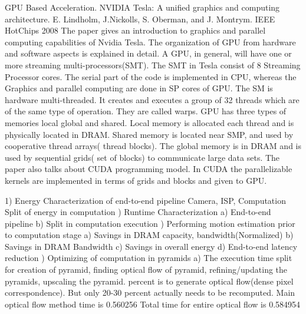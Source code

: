 GPU Based Acceleration.
NVIDIA Tesla: A unified graphics and computing architecture. E. Lindholm, J.Nickolls, S. Oberman, and J. Montrym. IEEE HotChips 2008
The paper gives an introduction to graphics and parallel computing capabilities of Nvidia Tesla. The organization of GPU from hardware and software aspects is explained in detail. A GPU, in general, will have one or more streaming multi-processors(SMT). The SMT in Tesla consist of 8 Streaming Processor cores. The serial part of the code is implemented in CPU, whereas the Graphics and parallel computing are done in SP cores of GPU. The SM is hardware multi-threaded. It creates and executes a group of 32 threads which are of the same type of operation. They are called warps. GPU has three types of memories local global and shared. Local memory is allocated each thread and is physically located in DRAM. Shared memory is located near SMP, and used by cooperative thread arrays( thread blocks). The global memory is in DRAM and is used by sequential grids( set of blocks) to communicate large data sets. The paper also talks about CUDA programming model. In CUDA the parallelizable kernels are implemented in terms of grids and blocks and given to GPU.

1) Energy Characterization of end-to-end pipeline\newline
Camera, ISP, Computation \newline
Split of energy in computation \newline
{}) Runtime Characterization \newline
a) End-to-end pipeline\newline
b) Split in computation execution\newline
{}) Performing motion estimation prior to computation stage\newline
a) Savings in DRAM capacity, bandwidth(Normalized) \newline
b) Savings in DRAM Bandwidth\newline
c) Savings in overall energy\newline
d) End-to-end latency reduction\newline
{}) Optimizing of computation in pyramids \newline
a) The execution time split for creation of pyramid, finding optical flow of pyramid, refining/updating the pyramids, upscaling the pyramid.  percent is to generate optical flow(dense pixel correspondence). But only 20-30 percent actually needs to be recomputed.\newline
Main optical flow method time is 0.560256
Total time for entire optical flow is 0.584954   
 

